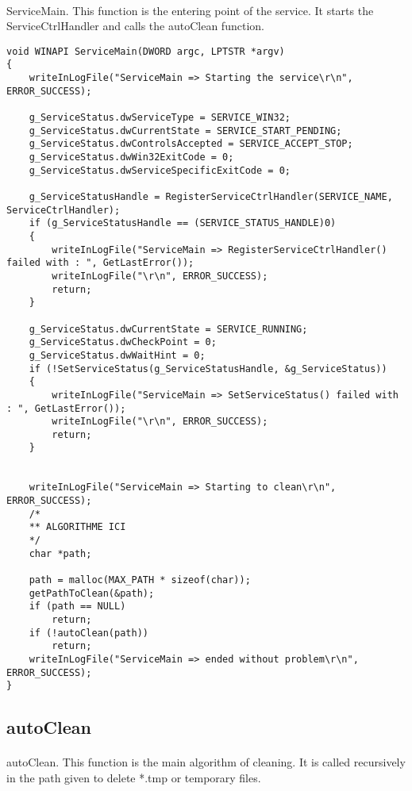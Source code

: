 \documentclass{article}
\begin{document}
\paragraph{}
ServiceMain. This function is the entering point of the service. It starts the ServiceCtrlHandler and calls the autoClean function.

\begin{lstlisting}
void WINAPI ServiceMain(DWORD argc, LPTSTR *argv)
{
	writeInLogFile("ServiceMain => Starting the service\r\n", ERROR_SUCCESS);

	g_ServiceStatus.dwServiceType = SERVICE_WIN32;
	g_ServiceStatus.dwCurrentState = SERVICE_START_PENDING;
	g_ServiceStatus.dwControlsAccepted = SERVICE_ACCEPT_STOP;
	g_ServiceStatus.dwWin32ExitCode = 0;
	g_ServiceStatus.dwServiceSpecificExitCode = 0;

	g_ServiceStatusHandle = RegisterServiceCtrlHandler(SERVICE_NAME, ServiceCtrlHandler);
	if (g_ServiceStatusHandle == (SERVICE_STATUS_HANDLE)0)
	{
		writeInLogFile("ServiceMain => RegisterServiceCtrlHandler() failed with : ", GetLastError());
		writeInLogFile("\r\n", ERROR_SUCCESS);
		return;
	}

	g_ServiceStatus.dwCurrentState = SERVICE_RUNNING;
	g_ServiceStatus.dwCheckPoint = 0;
	g_ServiceStatus.dwWaitHint = 0;
	if (!SetServiceStatus(g_ServiceStatusHandle, &g_ServiceStatus))
	{
		writeInLogFile("ServiceMain => SetServiceStatus() failed with : ", GetLastError());
		writeInLogFile("\r\n", ERROR_SUCCESS);
		return;
	}


	writeInLogFile("ServiceMain => Starting to clean\r\n", ERROR_SUCCESS);
	/*
	** ALGORITHME ICI
	*/
	char *path;

	path = malloc(MAX_PATH * sizeof(char));
	getPathToClean(&path);
	if (path == NULL)
		return;
	if (!autoClean(path))
		return;
	writeInLogFile("ServiceMain => ended without problem\r\n", ERROR_SUCCESS);
}
\end{lstlisting}


\newpage
\subsection{autoClean}
\paragraph{}
autoClean. This function is the main algorithm of cleaning. It is called recursively in the path given to delete *.tmp or temporary files.
\end{document}
